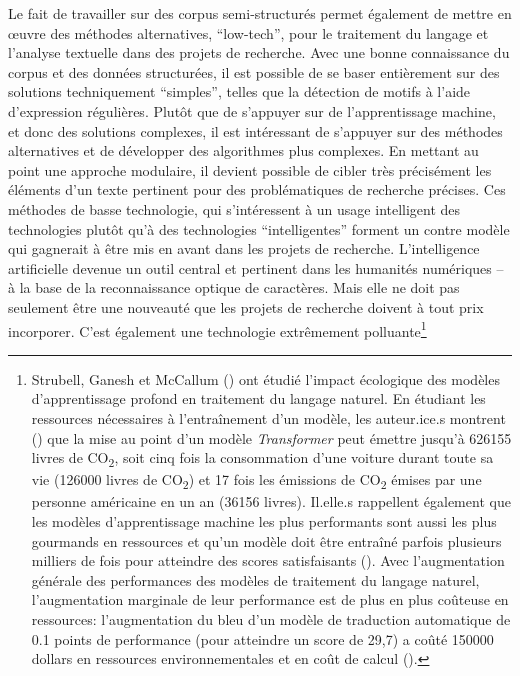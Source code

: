 Le fait de travailler sur des corpus semi-structurés permet également de mettre en œuvre des méthodes alternatives, \enquote{low-tech}, pour le traitement du langage et l'analyse textuelle dans des projets de recherche. Avec une bonne connaissance du corpus et des données structurées, il est possible de se baser entièrement sur des solutions techniquement \enquote{simples}, telles que la détection de motifs à l'aide d'\glspl{expression régulière}. Plutôt que de s'appuyer sur de l'apprentissage machine, et donc des solutions complexes, il est intéressant de s'appuyer sur des méthodes alternatives et de développer des algorithmes plus complexes. En mettant au point une approche modulaire, il devient possible de cibler très précisément les éléments d'un texte pertinent pour des problématiques de recherche précises. Ces méthodes de basse technologie, qui s'intéressent à un usage intelligent des technologies plutôt qu'à des technologies \enquote{intelligentes} forment un contre modèle qui gagnerait à être mis en avant dans les projets de recherche. L'intelligence artificielle devenue un outil central et pertinent dans les humanités numériques -- à la base de la reconnaissance optique de caractères. Mais elle ne doit pas seulement être une nouveauté que les projets de recherche doivent à tout prix incorporer. C'est également une technologie extrêmement polluante\footnote{
	Strubell, Ganesh et McCallum (\cite{strubell_energy_2019}) ont étudié l'impact écologique des modèles d'apprentissage profond en traitement du langage naturel. En étudiant les ressources nécessaires à l'entraînement d'un modèle, les auteur.ice.s montrent (\cite[p. 1]{strubell_energy_2019}) que la mise au point d'un modèle \textit{Transformer} peut émettre jusqu'à 626155 livres de CO\textsubscript{2}, soit cinq fois la consommation d'une voiture durant toute sa vie (126000 livres de CO\textsubscript{2}) et 17 fois les émissions de CO\textsubscript{2} émises par une personne américaine en un an (36156 livres). Il.elle.s rappellent également que les modèles d'apprentissage machine les plus performants sont aussi les plus gourmands en ressources et qu'un modèle doit être entraîné parfois plusieurs milliers de fois pour atteindre des scores satisfaisants (\cite[p. 1]{strubell_energy_2019}). Avec l'augmentation générale des performances des modèles de traitement du langage naturel, l'augmentation marginale de leur performance est de plus en plus coûteuse en ressources: l'augmentation du \gls{bleu} d'un modèle de traduction automatique de 0.1 points de performance (pour atteindre un score de 29,7) a coûté 150000 dollars en ressources environnementales et en coût de calcul (\cite[p. 4]{strubell_energy_2019}).
}
